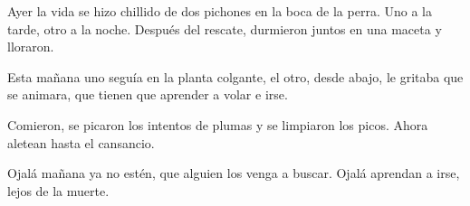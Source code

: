 
Ayer la vida se hizo chillido de dos pichones en la boca de la perra.
Uno a la tarde, otro a la noche. Después del rescate, durmieron juntos
en una maceta y lloraron.

Esta mañana uno seguía en la planta colgante, el otro, desde abajo, le
gritaba que se animara, que tienen que aprender a volar e irse. 

Comieron, se picaron los intentos de plumas y se limpiaron los picos.
Ahora aletean hasta el cansancio.

Ojalá mañana ya no estén, que alguien los venga a buscar. Ojalá aprendan
a irse, lejos de la muerte.

